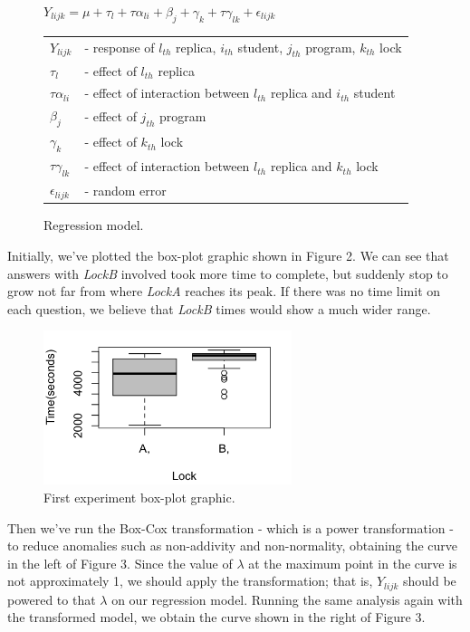 \begin{figure}
\begin{center}
$Y_{lijk} = \mu + \tau_{l} + \tau\alpha_{li} + \beta_{j} + \gamma_{k} + \tau\gamma_{lk} + \epsilon_{lijk}$\\
\vspace{4mm}
\begin{tabular}{ll}
$Y_{lijk}$ & - response of $l_{th}$ replica, $i_{th}$ student, $j_{th}$ program, $k_{th}$ lock \\
$\tau_{l}$ & - effect of $l_{th}$ replica \\
$\tau\alpha_{li}$ & - effect of interaction between $l_{th}$ replica and $i_{th}$ student \\
$\beta_{j}$ & - effect of $j_{th}$ program \\
$\gamma_{k}$ & - effect of $k_{th}$ lock \\
$\tau\gamma_{lk}$ & - effect of interaction between $l_{th}$ replica and $k_{th}$ lock \\
$\epsilon_{lijk}$ & - random error \\
\end{tabular}
\caption{Regression model.}
\end{center}
\end{figure}

Initially, we've plotted the box-plot graphic shown in Figure 2. We can see that answers with \emph{LockB} involved took more time to complete, but suddenly stop to grow not far from where \emph{LockA} reaches its peak. If there was no time limit on each question, we believe that \emph{LockB} times would show a much wider range.

\begin{figure}
\centering
\includegraphics[height=4.5cm]{img/u1.png}
\caption{First experiment box-plot graphic.}
\end{figure}

Then we've run the Box-Cox transformation - which is a power transformation - to reduce anomalies such as non-addivity and non-normality, obtaining the curve in the left of Figure 3. Since the value of $\lambda$ at the maximum point in the curve is not approximately 1, we should apply the transformation; that is, $Y_{lijk}$ should be powered to that $\lambda$ on our regression model. Running the same analysis again with the transformed model, we obtain the curve shown in the right of Figure 3.

